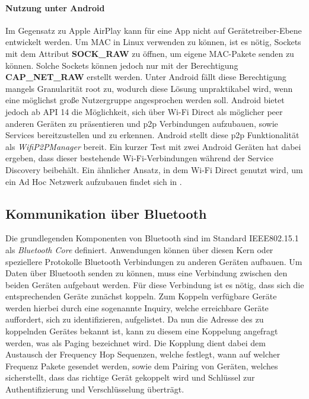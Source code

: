         \paragraph{Nutzung unter Android}
        Im Gegensatz zu Apple AirPlay kann für eine App nicht auf Gerätetreiber-Ebene entwickelt werden. Um MAC in Linux verwenden zu können, ist es nötig, Sockets mit dem Attribut {\bf SOCK\_RAW} zu öffnen,
        um eigene MAC-Pakete senden zu können. Solche Sockets können jedoch nur mit der Berechtigung {\bf CAP\_NET\_RAW} erstellt werden.\cite{linuxPacket}
        Unter Android fällt diese Berechtigung mangels Granularität root zu, wodurch diese Lösung unpraktikabel wird,
        wenn eine möglichst große Nutzergruppe angesprochen werden soll.\cite{androidRights}
        Android bietet jedoch ab API 14 die Möglichkeit, sich über Wi-Fi Direct als möglicher peer anderen Geräten zu präsentieren und
        p2p Verbindungen aufzubauen, sowie Services bereitzustellen und zu erkennen.
        Android stellt diese p2p Funktionalität als {\it WifiP2PManager} bereit. Ein kurzer Test mit zwei Android Geräten hat dabei ergeben,
        dass dieser bestehende Wi-Fi-Verbindungen während der Service Discovery beibehält.\cite{test-repository}
        Ein ähnlicher Ansatz, in dem Wi-Fi Direct genutzt wird, um ein Ad Hoc Netzwerk aufzubauen findet sich in \cite{Aneja}.

    \subsection{Kommunikation über Bluetooth}
        Die grundlegenden Komponenten von Bluetooth sind im Standard IEEE802.15.1 als {\it Bluetooth Core} definiert. Anwendungen können über diesen Kern oder speziellere Protokolle Bluetooth
        Verbindungen zu anderen Geräten aufbauen.\cite[S.228]{Lueders}
        Um Daten über Bluetooth senden zu können, muss eine Verbindung zwischen den beiden Geräten aufgebaut werden. Für diese Verbindung ist es nötig,
        dass sich die entsprechenden Geräte zunächst koppeln. Zum Koppeln verfügbare Geräte werden hierbei durch eine sogenannte Inquiry, welche erreichbare Geräte auffordert,
        sich zu identifizieren, aufgelistet. Da nun die Adresse des zu koppelnden Gerätes bekannt ist, kann zu diesem eine Koppelung angefragt werden, was als Paging bezeichnet wird.
        Die Kopplung dient dabei dem Austausch der Frequency Hop Sequenzen, welche festlegt, wann auf welcher Frequenz Pakete gesendet werden, sowie dem Pairing von Geräten, welches sicherstellt,
        dass das richtige Gerät gekoppelt wird und Schlüssel zur Authentifizierung und Verschlüsselung überträgt.\cite[S.402f.]{Sauter}

